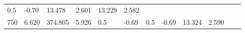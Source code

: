 \documentclass{article}
\begin{document}
\begin{longtable}[]{@{}llllllllllll@{}}
\begin{minipage}[t]{0.03\columnwidth}
0.5\strut
\end{minipage} & \begin{minipage}[t]{0.06\columnwidth}\raggedright\strut
-0.70\strut
\end{minipage} & \begin{minipage}[t]{0.06\columnwidth}\raggedright\strut
13.478\strut
\end{minipage} & \begin{minipage}[t]{0.08\columnwidth}\raggedright\strut
2.601\strut
\end{minipage} & \begin{minipage}[t]{0.06\columnwidth}\raggedright\strut
13.229\strut
\end{minipage} & \begin{minipage}[t]{0.09\columnwidth}\raggedright\strut
2.582\strut
\end{minipage}\tabularnewline
\begin{minipage}[t]{0.03\columnwidth}\raggedright\strut
750\strut
\end{minipage} & \begin{minipage}[t]{0.06\columnwidth}\raggedright\strut
6.620\strut
\end{minipage} & \begin{minipage}[t]{0.06\columnwidth}\raggedright\strut
374.805\strut
\end{minipage} & \begin{minipage}[t]{0.08\columnwidth}\raggedright\strut
5.926\strut
\end{minipage} & \begin{minipage}[t]{0.03\columnwidth}\raggedright\strut
0.5\strut
\end{minipage} & \begin{minipage}[t]{0.06\columnwidth}\raggedright\strut
-0.69\strut
\end{minipage} & \begin{minipage}[t]{0.03\columnwidth}\raggedright\strut
0.5\strut
\end{minipage} & \begin{minipage}[t]{0.06\columnwidth}\raggedright\strut
-0.69\strut
\end{minipage} & \begin{minipage}[t]{0.06\columnwidth}\raggedright\strut
13.324\strut
\end{minipage} & \begin{minipage}[t]{0.08\columnwidth}\raggedright\strut
2.590\strut
\end{minipage} & \begin{minipage}[t]{0.06\columnwidth}\raggedright\strut

\end{minipage}
\end{longtable}
\end{document}

